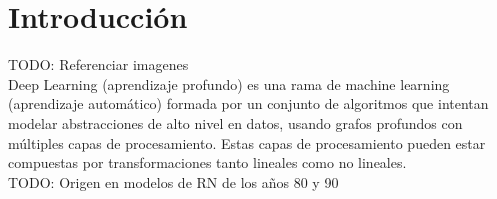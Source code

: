 \chapter{Introducción}
\label{chap:intro}

\vspace{-0.2cm}

TODO: Referenciar imagenes\\

Deep Learning (aprendizaje profundo) es una rama de machine learning (aprendizaje automático) formada por un conjunto de algoritmos que intentan modelar abstracciones de alto nivel en datos, usando grafos profundos con múltiples capas de procesamiento. Estas capas de procesamiento pueden estar compuestas por transformaciones tanto lineales como no lineales.\\
TODO: Origen en modelos de RN de los años 80 y 90

